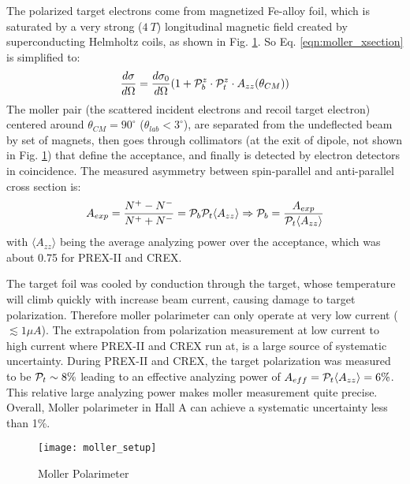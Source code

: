 The polarized target electrons come from magnetized Fe-alloy foil, which is 
saturated by a very strong ($4\ T$) longitudinal magnetic field created by 
superconducting Helmholtz coils, as shown in Fig. \ref{fig:moller_polarimeter}. 
So Eq. \ref{eqn:moller_xsection} is simplified to:
\begin{equation}
    \frac{d\sigma}{d\Omega} = \frac{d\sigma_0}{d\Omega} ( 1 + \mathcal{P}_b^z \cdot \mathcal{P}_t^z \cdot A_{zz}(\theta_{CM}))
    \label{eqn:moller_xsection_1}
\end{equation}
The moller pair (the scattered incident electrons and recoil target electron)
centered around $\theta_{CM} = 90^\circ$ ($\theta_{lab} < 3^\circ$), 
are separated from the undeflected beam by set of magnets, then goes through
collimators (at the exit of dipole, not shown in Fig. \ref{fig:moller_polarimeter}) 
that define the acceptance, and finally is detected by electron detectors in coincidence.
The measured asymmetry between spin-parallel and anti-parallel cross section is:
\begin{equation}
    A_{exp} = \frac{N^+ - N^-}{N^+ + N^-} = \mathcal{P}_b \mathcal{P}_t \langle A_{zz} \rangle 
    \Rightarrow
    \mathcal{P}_b = \frac{A_{exp}}{\mathcal{P}_t \langle A_{zz} \rangle}
\end{equation}
with $\langle A_{zz} \rangle$ being the average analyzing power over the acceptance,
which was about 0.75 for PREX-II and CREX.

The target foil was cooled by conduction through the target, whose temperature 
will climb quickly with increase beam current, causing damage to target
polarization. Therefore moller polarimeter can only operate at very low current ($\lesssim 1\mu A$).
The extrapolation from polarization measurement at low current to high current
where PREX-II and CREX run at, is a large source of systematic uncertainty.
During PREX-II and CREX, the target polarization was measured to be $\mathcal{P}_t \sim 8\%$ 
leading to an effective analyzing power of $A_{eff} = \mathcal{P}_t\langle A_{zz} \rangle = 6\%$.
This relative large analyzing power makes moller measurement quite precise.
Overall, Moller polarimeter in Hall A can achieve a systematic uncertainty less
than 1\%.

\begin{figure}[h!]
    \centering
    \texttt{[image: moller\_setup]}
    \caption{Moller Polarimeter}
    \label{fig:moller_polarimeter}
\end{figure}

